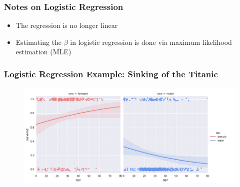 \documentclass[presentation]{beamer}
\begin{document}
\begin{frame}
  \frametitle{Notes on Logistic Regression}

\begin{itemize}
    \item The regression is no longer linear
    \item Estimating the $\beta$ in logistic regression is done via maximum likelihood estimation (MLE)
\end{itemize}

\end{frame}

\begin{frame}
  \frametitle{Logistic Regression Example: Sinking of the Titanic}
  
\begin{figure}
\begin{center}
\includegraphics[height=2in]{titanic_survival.png}
\end{center}
\end{figure}




\end{frame}
\end{document}
